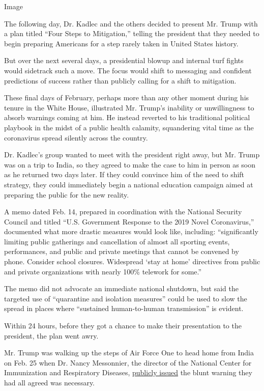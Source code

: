 Image

The following day, Dr. Kadlec and the others decided to present Mr.
Trump with a plan titled ``Four Steps to Mitigation,'' telling the
president that they needed to begin preparing Americans for a step
rarely taken in United States history.

But over the next several days, a presidential blowup and internal turf
fights would sidetrack such a move. The focus would shift to messaging
and confident predictions of success rather than publicly calling for a
shift to mitigation.

These final days of February, perhaps more than any other moment during
his tenure in the White House, illustrated Mr. Trump's inability or
unwillingness to absorb warnings coming at him. He instead reverted to
his traditional political playbook in the midst of a public health
calamity, squandering vital time as the coronavirus spread silently
across the country.

Dr. Kadlec's group wanted to meet with the president right away, but Mr.
Trump was on a trip to India, so they agreed to make the case to him in
person as soon as he returned two days later. If they could convince him
of the need to shift strategy, they could immediately begin a national
education campaign aimed at preparing the public for the new reality.

A memo dated Feb. 14, prepared in coordination with the National
Security Council and titled ``U.S. Government Response to the 2019 Novel
Coronavirus,'' documented what more drastic measures would look like,
including: ``significantly limiting public gatherings and cancellation
of almost all sporting events, performances, and public and private
meetings that cannot be convened by phone. Consider school closures.
Widespread `stay at home' directives from public and private
organizations with nearly 100\% telework for some.''

The memo did not advocate an immediate national shutdown, but said the
targeted use of ``quarantine and isolation measures'' could be used to
slow the spread in places where ``sustained human-to-human
transmission'' is evident.

Within 24 hours, before they got a chance to make their presentation to
the president, the plan went awry.

Mr. Trump was walking up the steps of Air Force One to head home from
India on Feb. 25 when Dr. Nancy Messonnier, the director of the National
Center for Immunization and Respiratory Diseases,
\href{https://www.cdc.gov/media/releases/2020/t0225-cdc-telebriefing-covid-19.html}{publicly
issued} the blunt warning they had all agreed was necessary.

